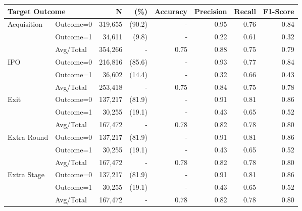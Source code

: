 \begin{tabular}{llrrrrrr} \toprule
\multicolumn{2}{l}{Target Outcome}  & N & (\%)    & Accuracy & Precision   & Recall & F1-Score \\ \midrule
Acquisition & Outcome=0 & 319,655 & (90.2) & - & 0.95 & 0.76 & 0.84 \\
            & Outcome=1 & 34,611 & (9.8) & - & 0.22 & 0.61 & 0.32 \\
            & Avg/Total & 354,266 & - & 0.75 & 0.88 & 0.75 & 0.79 \\
IPO         & Outcome=0 & 216,816 & (85.6) & - & 0.93 & 0.77 & 0.84 \\
            & Outcome=1 & 36,602 & (14.4) & - & 0.32 & 0.66 & 0.43 \\
            & Avg/Total & 253,418 & - & 0.75 & 0.84 & 0.75 & 0.78 \\
Exit        & Outcome=0 & 137,217 & (81.9) & - & 0.91 & 0.81 & 0.86 \\
            & Outcome=1 & 30,255 & (19.1) & - & 0.43 & 0.65 & 0.52 \\
            & Avg/Total & 167,472 & - & 0.78 & 0.82 & 0.78 & 0.80 \\
Extra Round & Outcome=0 & 137,217 & (81.9) & - & 0.91 & 0.81 & 0.86 \\
            & Outcome=1 & 30,255 & (19.1) & - & 0.43 & 0.65 & 0.52 \\
            & Avg/Total & 167,472 & - & 0.78 & 0.82 & 0.78 & 0.80 \\
Extra Stage & Outcome=0 & 137,217 & (81.9) & - & 0.91 & 0.81 & 0.86 \\
            & Outcome=1 & 30,255 & (19.1) & - & 0.43 & 0.65 & 0.52 \\
            & Avg/Total & 167,472 & - & 0.78 & 0.82 & 0.78 & 0.80 \\

\bottomrule \end{tabular}
